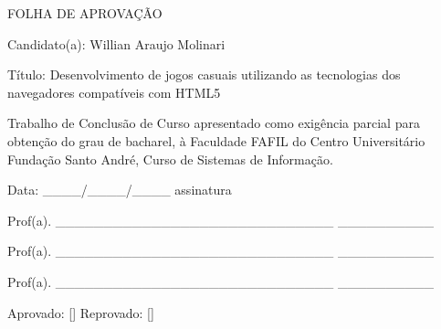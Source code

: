 \thispagestyle{empty}

\vspace{3cm}
\begin{center}
FOLHA DE APROVAÇÃO \\
\end{center}

\vspace{3cm}

\hspace{-2cm} Candidato(a): Willian Araujo Molinari

\vspace{0.5cm}

\hspace{-2cm} Título: Desenvolvimento de jogos casuais utilizando as tecnologias dos navegadores compatíveis com HTML5

\vspace{3cm}

Trabalho de Conclusão de Curso apresentado como exigência parcial para obtenção
do grau de bacharel, à Faculdade FAFIL do Centro Universitário Fundação Santo André,
Curso de Sistemas de Informação.\\

\vspace{2cm}

\hspace{-2cm} Data: \_\_\_\_/\_\_\_\_/\_\_\_\_  \hspace{7cm} assinatura

\vspace{1cm}

\hspace{-2cm} Prof(a). \_\_\_\_\_\_\_\_\_\_\_\_\_\_\_\_\_\_\_\_\_\_\_\_\_\_\_\_\_  \hspace{1cm}\_\_\_\_\_\_\_\_\_\_
\vspace{0.5cm}

\hspace{-2cm} Prof(a). \_\_\_\_\_\_\_\_\_\_\_\_\_\_\_\_\_\_\_\_\_\_\_\_\_\_\_\_\_  \hspace{1cm}\_\_\_\_\_\_\_\_\_\_
\vspace{0.5cm}

\hspace{-2cm} Prof(a). \_\_\_\_\_\_\_\_\_\_\_\_\_\_\_\_\_\_\_\_\_\_\_\_\_\_\_\_\_  \hspace{1cm}\_\_\_\_\_\_\_\_\_\_

\vspace{2cm}

\hspace{-2cm} Aprovado: [\hspace{1cm}]  \hspace{4cm} Reprovado: [\hspace{1cm}]
